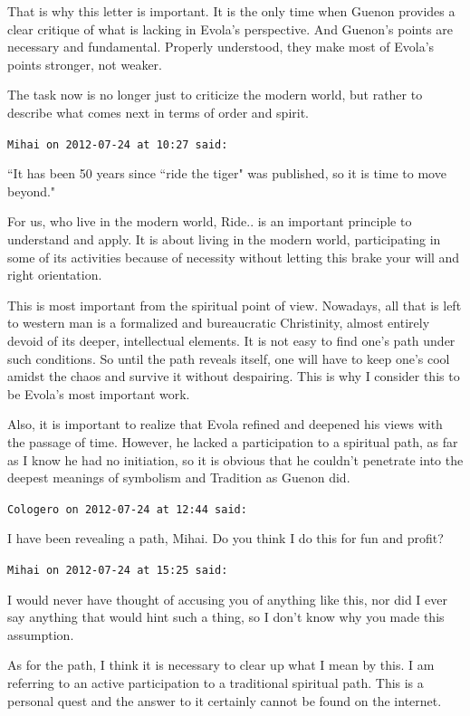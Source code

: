 \begin{footnotesize}
\begin{sffamily}
That is why this letter is important. It is the only time when Guenon provides a clear critique of what is lacking in Evola's perspective. And Guenon's points are necessary and fundamental. Properly understood, they make most of Evola's points stronger, not weaker.

The task now is no longer just to criticize the modern world, but rather to describe what comes next in terms of order and spirit.


\hfill

\texttt{Mihai on 2012-07-24 at 10:27 said: }

``It has been 50 years since ``ride the tiger" was published, so it is time to move beyond."

For us, who live in the modern world, Ride.. is an important principle to understand and apply. It is about living in the modern world, participating in some of its activities because of necessity without letting this brake your will and right orientation.

This is most important from the spiritual point of view. Nowadays, all that is left to western man is a formalized and bureaucratic Christinity, almost entirely devoid of its deeper, intellectual elements. It is not easy to find one's path under such conditions. So until the path reveals itself, one will have to keep one's cool amidst the chaos and survive it without despairing. This is why I consider this to be Evola's most important work. 

Also, it is important to realize that Evola refined and deepened his views with the passage of time. However, he lacked a participation to a spiritual path, as far as I know he had no initiation, so it is obvious that he couldn't penetrate into the deepest meanings of symbolism and Tradition as Guenon did.


\hfill

\texttt{Cologero on 2012-07-24 at 12:44 said: }

I have been revealing a path, Mihai. Do you think I do this for fun and profit?


\hfill

\texttt{Mihai on 2012-07-24 at 15:25 said: }

I would never have thought of accusing you of anything like this, nor did I ever say anything that would hint such a thing, so I don't know why you made this assumption.

As for the path, I think it is necessary to clear up what I mean by this. I am referring to an active participation to a traditional spiritual path. This is a personal quest and the answer to it certainly cannot be found on the internet.


\end{sffamily}
\end{footnotesize}
